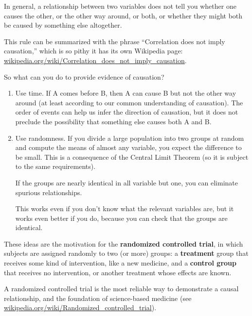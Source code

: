 \documentclass[12pt]{book}
\begin{document}
In general, a relationship between two variables does not tell you
whether one causes the other, or the other way around, or both, or
whether they might both be caused by something else altogether.

This rule can be summarized with the phrase ``Correlation
does not imply causation,'' which is so pithy it has its own
Wikipedia page: \url{wikipedia.org/wiki/Correlation_does_not_imply_causation}.

So what can you do to provide evidence of causation?

\begin{enumerate}

\item Use time.  If A comes before B, then A can cause B but not the
  other way around (at least according to our common understanding of
  causation).  The order of events can help us infer the direction
  of causation, but it does not preclude the possibility that something
  else causes both A and B.

\item Use randomness.  If you divide a large population into two
  groups at random and compute the means of almost any variable, you
  expect the difference to be small.  This is a consequence of the
  Central Limit Theorem (so it is subject to the same requirements).

  If the groups are nearly identical in all variable but one, you
  can eliminate spurious relationships.

  This works even if you don't know what the relevant variables
  are, but it works even better if you do, because you can check that
  the groups are identical.

\end{enumerate}

These ideas are the motivation for the {\bf randomized controlled
trial}, in which subjects are assigned randomly to two (or more)
groups: a {\bf treatment} group that receives some kind of intervention,
like a new medicine, and a {\bf control group} that receives
no intervention, or another treatment whose effects are known.

A randomized controlled trial is the most reliable way to demonstrate
a causal relationship, and the foundation of science-based medicine
(see \url{wikipedia.org/wiki/Randomized_controlled_trial}).
\end{document}
